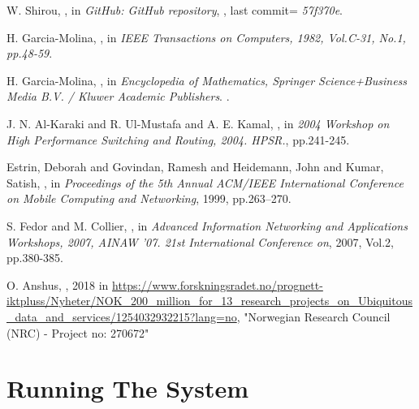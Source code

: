 \documentclass[USenglish]{uit-thesis}
\begin{document}
\begin{thebibliography}{9}
W. Shirou,
,
\newblock in {\em GitHub: GitHub repository},
, last commit={ \textit{57f370e}}.

H. Garcia-Molina,
,
\newblock in {\em IEEE Transactions on Computers, 1982, Vol.C-31, No.1, pp.48-59}.

H. Garcia-Molina,
,
\newblock in {\em  Encyclopedia of Mathematics, Springer Science+Business Media B.V. / Kluwer Academic Publishers}.
.

J. N. Al-Karaki and R. Ul-Mustafa and A. E. Kamal,
,
\newblock in {\em  2004 Workshop on High Performance Switching and Routing, 2004. HPSR.}, pp.241-245.

Estrin, Deborah and Govindan, Ramesh and Heidemann, John and Kumar, Satish,
,
\newblock in {\em Proceedings of the 5th Annual ACM/IEEE International Conference on Mobile Computing and Networking}, 1999, pp.263--270.


S. Fedor and M. Collier,
,
\newblock in {\em Advanced Information Networking and Applications Workshops, 2007, AINAW '07. 21st International Conference on}, 2007, Vol.2, pp.380-385.


O. Anshus,
, 2018
\newblock in {\url{https://www.forskningsradet.no/prognett-iktpluss/Nyheter/NOK_200_million_for_13_research_projects_on_Ubiquitous_data_and_services/1254032932215?lang=no}}, "Norwegian Research Council (NRC) - Project no: 270672"


\end{thebibliography}



\appendix
\appendixpage
\addappheadtotoc
\chapter{Running The System}
\glsresetall
\end{document}
